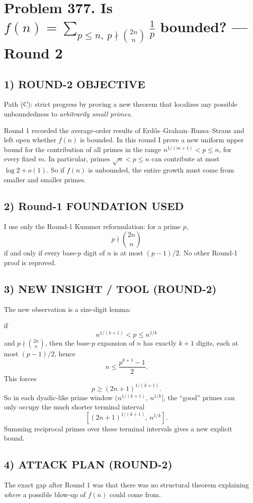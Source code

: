 \section*{Problem 377. Is $\displaystyle f(n)=\sum_{p\le n,\ p\nmid \binom{2n}{n}}\frac1p$ bounded? --- Round 2}

\subsection*{1) ROUND-2 OBJECTIVE}
Path (C): strict progress by proving a new theorem that localizes any possible unboundedness to \emph{arbitrarily small primes}.

Round 1 recorded the average-order results of Erd\H{o}s--Graham--Ruzsa--Straus and left open whether $f(n)$ is bounded.
In this round I prove a new uniform upper bound for the contribution of all primes in the range $n^{1/(m+1)}<p\le n$, for every fixed $m$.
In particular, primes $\sqrt{n}<p\le n$ can contribute at most $\log 2+o(1)$.
So if $f(n)$ is unbounded, the entire growth must come from smaller and smaller primes.

\subsection*{2) Round-1 FOUNDATION USED}
I use only the Round-1 Kummer reformulation:
for a prime $p$,
\[
p\nmid \binom{2n}{n}
\]
if and only if every base-$p$ digit of $n$ is at most $(p-1)/2$.
No other Round-1 proof is reproved.

\subsection*{3) NEW INSIGHT / TOOL (ROUND-2)}
The new observation is a size-digit lemma:

if
\[
n^{1/(k+1)}<p\le n^{1/k}
\]
and $p\nmid \binom{2n}{n}$, then the base-$p$ expansion of $n$ has exactly $k+1$ digits, each at most $(p-1)/2$, hence
\[
n\le \frac{p^{k+1}-1}{2}.
\]
This forces
\[
p\ge (2n+1)^{1/(k+1)}.
\]
So in each dyadic-like prime window $(n^{1/(k+1)},\,n^{1/k}]$, the ``good'' primes can only occupy the much shorter terminal interval
\[
[(2n+1)^{1/(k+1)},\,n^{1/k}].
\]
Summing reciprocal primes over these terminal intervals gives a new explicit bound.

\subsection*{4) ATTACK PLAN (ROUND-2)}
The exact gap after Round 1 was that there was no structural theorem explaining \emph{where} a possible blow-up of $f(n)$ could come from.


